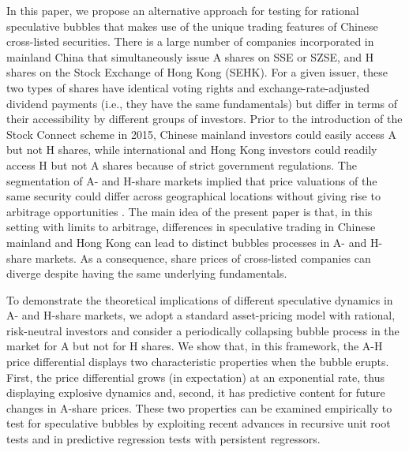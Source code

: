 \documentclass[11pt]{article}
\begin{document}
In this paper, we propose an alternative approach for testing for rational speculative bubbles that makes use of the unique trading features of Chinese cross-listed securities. There is a large number of companies incorporated in mainland China that simultaneously issue A shares on SSE or SZSE, and H shares on the Stock Exchange of Hong Kong (SEHK). For a given issuer, these two types of shares have identical voting rights and exchange-rate-adjusted dividend payments (i.e., they have the same fundamentals) but differ in terms of their accessibility by different groups of investors. Prior to the introduction of the Stock Connect scheme in 2015, Chinese mainland investors could easily access A but not H shares, while international and Hong Kong investors could readily access H but not A shares because of strict government regulations. The segmentation of A- and H-share markets implied that price valuations of the same security could differ across geographical locations without giving rise to arbitrage opportunities \citep{chenK1995,frootD1999,LamontT2003}. The main idea of the present paper is that, in this setting with limits to arbitrage, differences in speculative trading in Chinese mainland and Hong Kong can lead to distinct bubbles processes in A- and H-share markets. As a consequence, share prices of cross-listed companies can diverge despite having the same underlying fundamentals.

To demonstrate the theoretical implications of different speculative dynamics in A- and H-share markets, we adopt a standard asset-pricing model with rational, risk-neutral investors and consider  a periodically collapsing bubble process in the market for A but not for H shares. We show that, in this framework, the A-H price differential displays two characteristic properties when the bubble erupts. First, the price differential grows (in expectation) at an exponential rate, thus displaying explosive dynamics and, second, it has predictive content for future changes in A-share prices. These two properties can be examined empirically to test for speculative bubbles by exploiting recent advances in recursive unit root tests and in predictive regression tests with persistent regressors.

\end{document}
